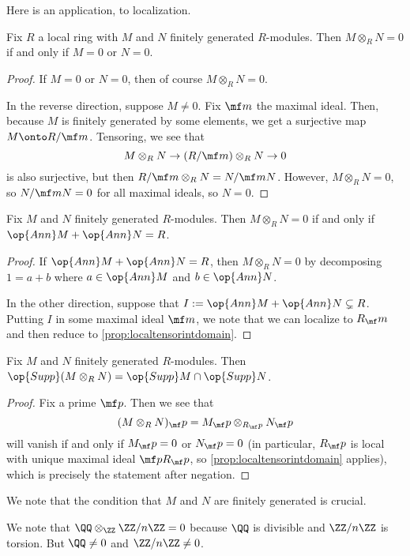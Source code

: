 Here is an application, to localization.
\begin{proposition} \label{prop:localtensorintdomain}
	Fix $R$ a local ring with $M$ and $N$ finitely generated $R$-modules. Then $M\otimes_RN=0$ if and only if $M=0$ or $N=0$.
\end{proposition}
\begin{proof}
	If $M=0$ or $N=0$, then of course $M\otimes_RN=0$.
	
	In the reverse direction, suppose $M\ne0$. Fix $\mf m$ the maximal ideal. Then, because $M$ is finitely generated by some elements, we get a surjective map $M\onto R/\mf m$. Tensoring, we see that
	\[M\otimes_RN\to(R/\mf m)\otimes_RN\to0\]
	is also surjective, but then $R/\mf m\otimes_RN=N/\mf mN$. However, $M\otimes_RN=0$, so $N/\mf mN=0$ for all maximal ideals, so $N=0$.
\end{proof}
\begin{corollary}
	Fix $M$ and $N$ finitely generated $R$-modules. Then $M\otimes_RN=0$ if and only if $\op{Ann}M+\op{Ann}N=R$.
\end{corollary}
\begin{proof}
	If $\op{Ann}M+\op{Ann}N=R$, then $M\otimes_RN=0$ by decomposing $1=a+b$ where $a\in\op{Ann}M$ and $b\in\op{Ann}N$.

	In the other direction, suppose that $I:=\op{Ann}M+\op{Ann}N\subsetneq R$. Putting $I$ in some maximal ideal $\mf m$, we note that we can localize to $R_\mf m$ and then reduce to \autoref{prop:localtensorintdomain}.
\end{proof}
\begin{corollary}
	Fix $M$ and $N$ finitely generated $R$-modules. Then $\op{Supp}(M\otimes_RN)=\op{Supp}M\cap\op{Supp}N$.
\end{corollary}
\begin{proof}
	Fix a prime $\mf p$. Then we see that
	\[(M\otimes_RN)_\mf p=M_\mf p\otimes_{R_\mf p}N_\mf p\]
	will vanish if and only if $M_\mf p=0$ or $N_\mf p=0$ (in particular, $R_\mf p$ is local with unique maximal ideal $\mf pR_\mf p$, so \autoref{prop:localtensorintdomain} applies), which is precisely the statement after negation.
\end{proof}
We note that the condition that $M$ and $N$ are finitely generated is crucial.
\begin{nex}
	We note that $\QQ\otimes_\ZZ\ZZ/n\ZZ=0$ because $\QQ$ is divisible and $\ZZ/n\ZZ$ is torsion. But $\QQ\ne0$ and $\ZZ/n\ZZ\ne0$.
\end{nex}

